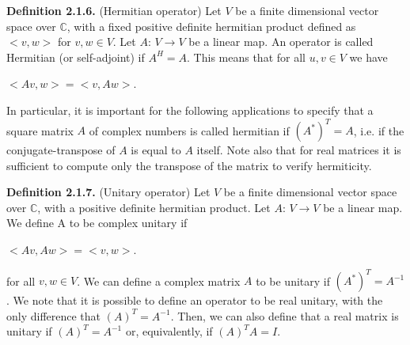 \documentclass[12pt]{report}
\begin{document}
	
	\begin{minipage}{1\textwidth}	
		
		\textbf{Definition 2.1.6.} (Hermitian operator) Let $V$ be  a finite dimensional vector space over $\mathbb{C}$, with a fixed positive definite hermitian product defined as $<v,w>$ for $v,w \in V$. Let $A$: $V \rightarrow V$ be a linear map. An operator is called Hermitian (or self-adjoint) if $A^H=A$. This means that for all $u,v \in V$ we have\newline
		
		\begin{center}
			$<Av,w> = <v,Aw>$.
		\end{center}
		
		In particular, it is important for the following applications to specify that a square matrix $A$ of complex numbers is called hermitian if $(A^*)^T = A$, i.e. if the conjugate-transpose of $A$ is equal to $A$ itself. Note also that for real matrices it is sufficient to compute only the transpose of the matrix to verify hermiticity. \newline
		
		\textbf{Definition 2.1.7.} (Unitary operator) Let $V$ be  a finite dimensional vector space over $\mathbb{C}$, with a positive definite hermitian product. Let $A$: $V \rightarrow V$ be a linear map. We define A to be complex unitary if \newline
		
		\begin{center}
			$<Av,Aw> = <v,w>$.
		\end{center}
		
		for all $v,w \in V$. We can define a complex matrix $A$ to be unitary if $ (A^*)^T=A^{-1}$. We note that it is possible to define an operator to be real unitary, with the only difference that $(A)^T = A^{-1}$. Then, we can also define that a real matrix is unitary if $(A)^T = A^{-1}$ or, equivalently, if $(A)^T A=I$.\newline
		
	\end{minipage}  
	
	
	
\end{document}
